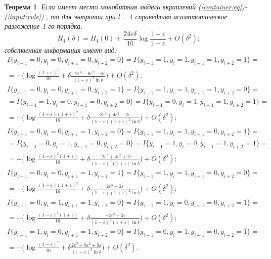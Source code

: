 ﻿\documentclass[a4paper,12pt]{article}
\theoremstyle{plain}
\newtheorem{theorem}{Теорема}[section]
\begin{document}
\begin{theorem}
	Если имеет место монобитная модель вкраплений (\ref{container:eq})-(\ref{input:rule}) , то для энтропии при $l=4$ справедливо асимптотическое разложение 1-го порядка:
	\begin{equation}
		H_4(\delta)=H_4(0)+\frac{24\varepsilon\delta}{16} \log\frac{1+\varepsilon}{1-\varepsilon}+ O(\delta^2);
	\end{equation}
	собственная информация имеет вид:\\
	\begin{gather*}
		I\{y_{i-1} = 0, y_i = 0, y_{i+1} = 0, y_{i+2} = 0 \}=I\{y_{i-1} = 1, y_i = 1, y_{i+1} = 1, y_{i+2} = 1 \}=\\= -\biggr(\log\frac{(1+\varepsilon)^3}{16} + \delta \frac{-2\varepsilon^3-8\varepsilon^2-6\varepsilon}{(1+\varepsilon)^3\ln b}\biggr) +O(\delta^2) ;\\
		I\{y_{i-1} = 0, y_i = 0, y_{i+1} = 0, y_{i+2} = 1 \}=I\{y_{i-1} = 1, y_i = 1, y_{i+1} = 1, y_{i+2} = 0 \}=\\=
		I\{y_{i-1} = 1, y_i = 0, y_{i+1} = 0, y_{i+2} = 0 \}=I\{y_{i-1} = 0, y_i = 1, y_{i+1} = 1, y_{i+2} = 1 \}=\\= -\biggr(\log\frac{(1-\varepsilon)(1+\varepsilon)^2}{16} + \delta \frac{2\varepsilon^3+4\varepsilon^2-2\varepsilon}{(1-\varepsilon)(1+\varepsilon)^2\ln b}\biggr) +O(\delta^2);\\
		I\{y_{i-1} = 0, y_i = 0, y_{i+1} = 1, y_{i+2} = 0 \}=I\{y_{i-1} = 1, y_i = 1, y_{i+1} = 0, y_{i+2} = 1 \}=\\=
		I\{y_{i-1} = 0, y_i = 1, y_{i+1} = 0, y_{i+2} = 0 \}=I\{y_{i-1} = 1, y_i = 0, y_{i+1} = 1, y_{i+2} = 1 \}=\\=
		-\biggr(\log\frac{(1-\varepsilon)^2(1+\varepsilon)}{16} + \delta \frac{-2\varepsilon^3+4\varepsilon^2+2\varepsilon}{(1-\varepsilon)^2(1+\varepsilon)\ln b}\biggr) +O(\delta^2);\\
		I\{y_{i-1} = 0, y_i = 0, y_{i+1} = 1, y_{i+2} = 1 \}=I\{y_{i-1} = 1, y_i = 1, y_{i+1} = 0, y_{i+2} = 0 \}=\\= -\biggr(\log\frac{(1-\varepsilon)(1+\varepsilon)^2}{16} + \delta \frac{2\varepsilon^3-2\varepsilon}{(1-\varepsilon)(1+\varepsilon)^2\ln b}\biggr) +O(\delta^2);    \\
		I\{y_{i-1} = 0, y_i = 1, y_{i+1} = 1, y_{i+2} = 0 \}=I\{y_{i-1} = 1, y_i = 0, y_{i+1} = 0, y_{i+2} = 1 \}=\\= -\biggr(\log\frac{(1-\varepsilon)^2(1+\varepsilon)}{16} + \delta \frac{-2\varepsilon^3+2\varepsilon}{(1-\varepsilon)^2(1+\varepsilon)\ln b}\biggr) +O(\delta^2);\\  
		I\{y_{i-1} = 1, y_i = 0, y_{i+1} = 1, y_{i+2} = 0 \}=I\{y_{i-1} = 0, y_i = 1, y_{i+1} = 0, y_{i+2} = 1 \}=\\= -\biggr(\log\frac{(1-\varepsilon)^3}{16} + \delta \frac{2\varepsilon^3-8\varepsilon^2+6\varepsilon}{(1-\varepsilon)^3\ln b}\biggr) +O(\delta^2).
	\end{gather*}
\end{theorem}
\end{document}
